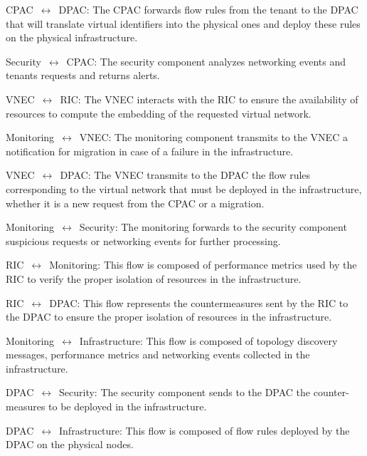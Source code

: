  CPAC~$\leftrightarrow$~DPAC: The CPAC forwards flow rules from the tenant to the DPAC that will translate virtual identifiers into the physical ones and deploy these rules on the physical infrastructure.

 Security~$\leftrightarrow$~CPAC: The security component analyzes networking events and tenants requests and returns alerts.

 VNEC~$\leftrightarrow$~RIC: The VNEC interacts with the RIC to ensure the availability of resources to compute the embedding of the requested virtual network.

 Monitoring~$\leftrightarrow$~VNEC: The monitoring component transmits to the VNEC a notification for migration in case of a failure in the infrastructure.

 VNEC~$\leftrightarrow$~DPAC: The VNEC transmits to the DPAC the flow rules corresponding to the virtual network that must be deployed in the infrastructure, whether it is a new request from the CPAC or a migration.

 Monitoring~$\leftrightarrow$~Security: The monitoring forwards to the security component suspicious requests or networking events for further processing.

 RIC~$\leftrightarrow$~Monitoring: This flow is composed of performance metrics used by the RIC to verify the proper isolation of resources in the infrastructure.

 RIC~$\leftrightarrow$~DPAC: This flow represents the countermeasures sent by the RIC to the DPAC to ensure the proper isolation of resources in the infrastructure.

 Monitoring~$\leftrightarrow$~Infrastructure: This flow is composed of topology discovery messages, performance metrics and networking events collected in the infrastructure.

 DPAC~$\leftrightarrow$~Security: The security component sends to the DPAC the counter-measures to be deployed in the infrastructure.

 DPAC~$\leftrightarrow$~Infrastructure: This flow is composed of flow rules deployed by the DPAC on the physical nodes.

